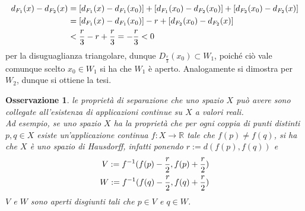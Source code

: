 \documentclass[oneside, 11pt]{amsbook}
\makeatletter
\newcommand{\0}{{(0)}}
\newcommand{\3}{{(3)}}
\theoremstyle{colonplain}
\theoremstyle{colondefinition}
\theoremstyle{colonremark}
\newtheorem{rmk}[thm]{Osservazione}
\numberwithin{equation}{chapter}
\renewcommand{\proofname}{Dimostrazione}
\renewenvironment{proof}[1][\proofname]{\par
  \pushQED{\qed}%
  \normalfont \topsep6\p@\@plus6\p@\relax
  \trivlist
  \item[\hskip\labelsep\bfseries #1:]\ignorespaces
}{%
  \popQED\endtrivlist\@endpefalse
}
\makeatother
\begin{document}
\begin{proof}
\begin{align}
    d_{F_1}(x) - d_{F_2}(x) &= [d_{F_1}(x) - d_{F_1}(x_0)] + [d_{F_1}(x_0) - d_{F_2}(x_0)] + [d_{F_2}(x_0) - d_{F_2}(x)] \notag \\
    &= [d_{F_1}(x) - d_{F_1}(x_0)] - r + [d_{F_2}(x_0) - d_{F_2}(x)] \notag \\
    &< \frac{r}{3} - r + \frac{r}{3} = -\frac{r}{3} < 0 \notag
\end{align}
per la disuguaglianza triangolare, dunque $D_{\frac{r}{3}}(x_0) \subset W_1$, poiché ciò vale comunque scelto $x_0 \in W_1$ si ha che $W_1$ è aperto. Analogamente si dimostra per $W_2$, dunque si ottiene la tesi.
\end{proof}
\begin{rmk}
le proprietà di separazione che uno spazio $X$ può avere sono collegate all'esistenza di applicazioni continue su $X$ a valori reali. \\
Ad esempio, se uno spazio $X$ ha la proprietà che per ogni coppia di punti distinti $p, q \in X$ esiste un'applicazione continua $f : X \longrightarrow \mathbb{R}$ tale che $f(p) \neq f(q)$, si ha che $X$ è uno spazio di Hausdorff, infatti ponendo $r := d(f(p), f(q))$ e
\begin{align}
    V := f^{-1}(f(p) - \frac{r}{2}, f(p) + \frac{r}{2}) \notag \\
    W := f^{-1}(f(q) - \frac{r}{2}, f(q) + \frac{r}{2}) \notag
\end{align}
$V$ e $W$ sono aperti disgiunti tali che $p \in V$ e $q \in W$.
\end{rmk}
\end{document}
